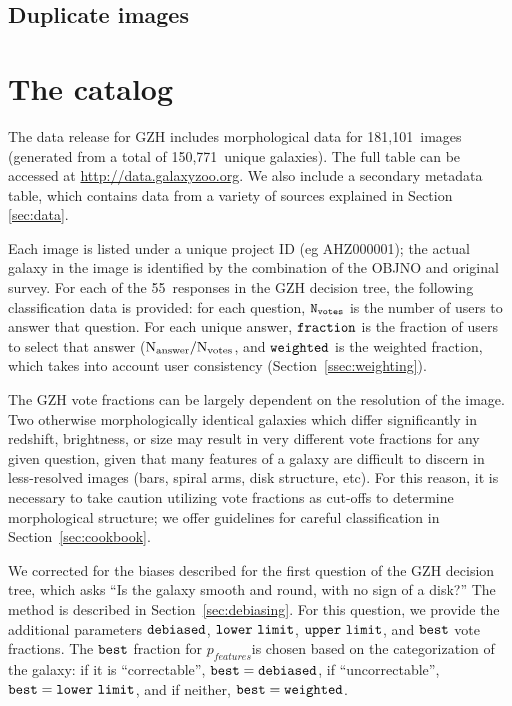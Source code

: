 \documentclass[twocolumn]{aastex6}
\begin{document}
\subsection{Duplicate images}

\section{The catalog}\label{sec:results}

The data release for GZH includes morphological data for 181,101~images (generated from a total of 150,771~unique galaxies). The full table can be accessed at \url{http://data.galaxyzoo.org}. We also include a secondary metadata table, which contains data from a variety of sources explained in Section \ref{sec:data}.

Each image is listed under a unique project ID (eg AHZ000001); the actual galaxy in the image is identified by the combination of the OBJNO and original survey. For each of the 55~responses in the GZH decision tree, the following classification data is provided: for each question, $\tt N_{votes}$ is the number of users to answer that question. For each unique answer, $\tt fraction$ is the fraction of users to select that answer ($\rm N_{answer}/N_{votes}$, and $\tt weighted$ is the weighted fraction, which takes into account user consistency (Section~\ref{ssec:weighting}). 

The GZH vote fractions can be largely dependent on the resolution of the image. Two otherwise morphologically identical galaxies which differ significantly in redshift, brightness, or size may result in very different vote fractions for any given question, given that many features of a galaxy are difficult to discern in less-resolved images (bars, spiral arms, disk structure, etc). For this reason, it is necessary to take caution utilizing vote fractions as cut-offs to determine morphological structure; we offer guidelines for careful classification in Section~\ref{sec:cookbook}. 

We corrected for the biases described for the first question of the GZH decision tree, which asks ``Is the galaxy smooth and round, with no sign of a disk?'' The method is described in Section~\ref{sec:debiasing}. For this question, we provide the additional parameters $\tt debiased$, $\tt lower~limit$, $\tt upper~limit$, and $\tt best$ vote fractions. The $\tt best$ fraction for $p_{features}$is chosen based on the categorization of the galaxy: if it is ``correctable'', $\tt best = debiased$, if ``uncorrectable'', $\tt best = lower~limit$, and if neither, $\tt best = weighted$. 
\end{document}
